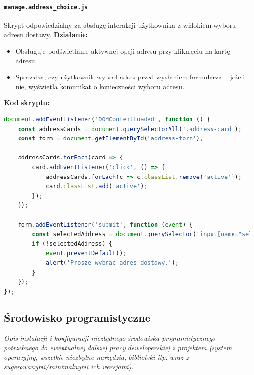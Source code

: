 \documentclass[12pt,a4paper,oneside]{article}
\theoremstyle{definition}
\numberwithin{equation}{section}
\begin{document}
\paragraph{\texttt{manage.address\_choice.js}}
Skrypt odpowiedzialny za obsługę interakcji użytkownika z widokiem wyboru adresu dostawy.  
\textbf{Działanie:}
\begin{itemize}
    \item Obsługuje podświetlanie aktywnej opcji adresu przy kliknięciu na kartę adresu.
    \item Sprawdza, czy użytkownik wybrał adres przed wysłaniem formularza – jeżeli nie, wyświetla komunikat o konieczności wyboru adresu.
\end{itemize}

\textbf{Kod skryptu:}
\begin{lstlisting}[language=JavaScript, caption=Skrypt manage.address\_choice.js]
document.addEventListener('DOMContentLoaded', function () {
    const addressCards = document.querySelectorAll('.address-card');
    const form = document.getElementById('address-form');

    addressCards.forEach(card => {
        card.addEventListener('click', () => {
            addressCards.forEach(c => c.classList.remove('active'));
            card.classList.add('active');
        });
    });

    form.addEventListener('submit', function (event) {
        const selectedAddress = document.querySelector('input[name="selected_address"]:checked');
        if (!selectedAddress) {
            event.preventDefault();
            alert('Prosze wybrac adres dostawy.');
        }
    });
});
\end{lstlisting}








\subsection{Środowisko programistyczne}
\textit{Opis instalacji i konfiguracji niezbędnego środowiska programistycznego potrzebnego do ewentualnej dalszej pracy deweloperskiej z projektem (system operacyjny, wszelkie niezbędne narzędzia, biblioteki itp. wraz z sugerowanymi/minimalnymi ich wersjami).}





\renewcommand\refname{Literatura (jeżeli wymagana)}

%
%
%
\end{document}
